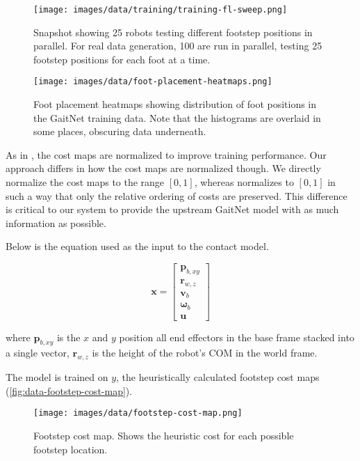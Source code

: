 \begin{figure}
  \centering
  \texttt{[image: images/data/training/training-fl-sweep.png]}
  \caption{Snapshot showing 25 robots testing different footstep
    positions in parallel. For real data generation, 100 are run in
  parallel, testing 25 footstep positions for each foot at a time.}
\end{figure}

\begin{figure}
  \centering
  \texttt{[image: images/data/foot-placement-heatmaps.png]}
  \caption{Foot placement heatmaps showing distribution of foot
    positions in the GaitNet training data. Note that the histograms
  are overlaid in some places, obscuring data underneath.}
  \label{fig:data-cn-training-process}
\end{figure}

As in \cite{bratta_contactnet_2024}, the cost maps are normalized to
improve training performance. Our approach differs in how the cost
maps are normalized though. We directly normalize the cost maps to
the range $[0, 1]$, whereas \cite{bratta_contactnet_2024} normalizes
to $[0,1]$ in such a way that only the relative ordering of costs are
preserved. This difference is critical to our system to provide the
upstream GaitNet model with as much information as possible.

Below is the equation used as the input to the contact model.

\[
  \mathbf{x} =
  \begin{bmatrix}
    \mathbf p_{b,xy} \\
    \mathbf r_{w,z} \\
    \mathbf v_b \\
    \mathbf \omega_b \\
    \mathbf u
  \end{bmatrix}
\]

where
$\mathbf p_{b,xy}$ is the $x$ and $y$ position all end effectors in
the base frame stacked into a single vector,
$\mathbf r_{w,z}$ is the height of the robot's COM in the world frame.

The model is trained on $y$, the heuristically calculated footstep
cost maps (\autoref{fig:data-footstep-cost-map}).

\begin{figure}
  \centering
  \texttt{[image: images/data/footstep-cost-map.png]}
  \caption{Footstep cost map. Shows the heuristic cost for each
  possible footstep location.}
  \label{fig:data-footstep-cost-map}
\end{figure}


